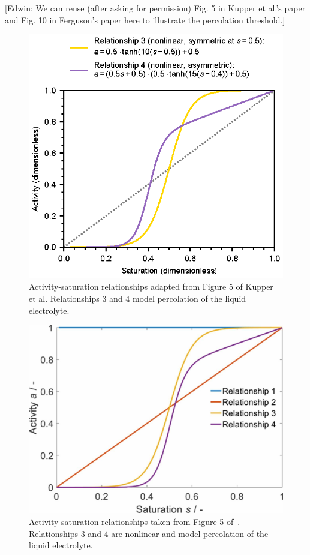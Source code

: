 \documentclass{article}
\begin{document}
[Edwin: We can reuse (after asking for permission) Fig. 5 in Kupper et al.'s paper and Fig. 10 in Ferguson's paper here to illustrate the percolation threshold.]

\begin{figure}[ht]
\centering
\includegraphics[scale=1.0]{figures/percolation.eps}
\caption{Activity-saturation relationships adapted from Figure 5 of Kupper et al.\cite{kupper_end--life_2018} Relationships 3 and 4 model percolation of the liquid electrolyte.}
\label{fig:percolation}
\end{figure}

\begin{figure}[ht]
    \centering
    \includegraphics[scale=0.75]{figures/A3468fig5.jpeg}
    \caption{Activity-saturation relationships taken from Figure 5 of~\cite{kupper_end--life_2018}. Relationships 3 and 4 are nonlinear and model percolation of the liquid electrolyte.}
    \label{fig:activity-saturation-relationships}
\end{figure}
\end{document}
